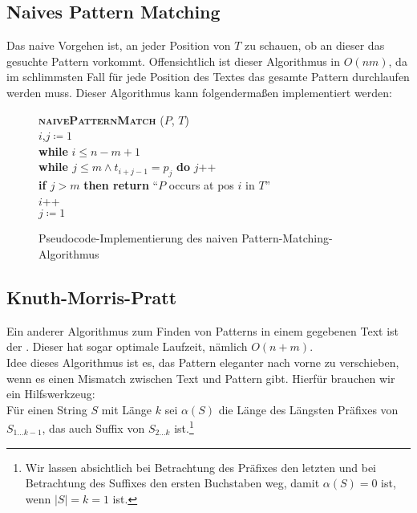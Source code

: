 \subsection{Naives Pattern Matching}
Das naive Vorgehen ist, an jeder Position von \( T \) zu schauen, ob an dieser das gesuchte Pattern vorkommt. Offensichtlich ist dieser Algorithmus in \( O(nm) \), da im schlimmsten Fall für jede Position des Textes das gesamte Pattern durchlaufen werden muss. Dieser Algorithmus kann folgendermaßen implementiert werden:
\begin{figure}[H]
  \begin{pseudocode}
    \textbf{\textsc{naivePatternMatch}} (\( P \), \( T \)) \\
    \( i \),\( j \coloneqq 1 \) \\
    \textbf{while} \( i \leq n-m+1 \) \\
    \phantom{\quad} \textbf{while \( j \leq m \wedge t_{i+j-1} = p_j \)} \textbf{do} \( j \)++ \\
    \phantom{\quad} \textbf{if \( j > m \)} \textbf{then return} ``\( P \) occurs at pos \( i \) in \( T \)'' \\
    \phantom{\quad} \( i \)++ \\
    \phantom{\quad} \( j \coloneqq 1 \)
  \end{pseudocode}
  \caption{Pseudocode-Implementierung des naiven Pattern-Matching-Algorithmus}
\end{figure}

\subsection{Knuth-Morris-Pratt}
Ein anderer Algorithmus zum Finden von Patterns in einem gegebenen Text ist der \label{def:kmpAlgorithmus}. Dieser hat sogar optimale Laufzeit, nämlich \( O(n+m) \). \\
Idee dieses Algorithmus ist es, das Pattern eleganter nach vorne zu verschieben, wenn es einen Mismatch zwischen Text und Pattern gibt. Hierfür brauchen wir ein Hilfswerkzeug: \\
Für einen String \( S \) mit Länge \( k \) sei \( \alpha(S) \) die Länge des Längsten Präfixes von \( S_{1\dots k-1} \), das auch Suffix von \( S_{2\dots k} \) ist.\footnote{Wir lassen absichtlich bei Betrachtung des Präfixes den letzten und bei Betrachtung des Suffixes den ersten Buchstaben weg, damit \( \alpha(S) = 0 \) ist, wenn \( \left\vert S \right\vert = k = 1 \) ist.} 

